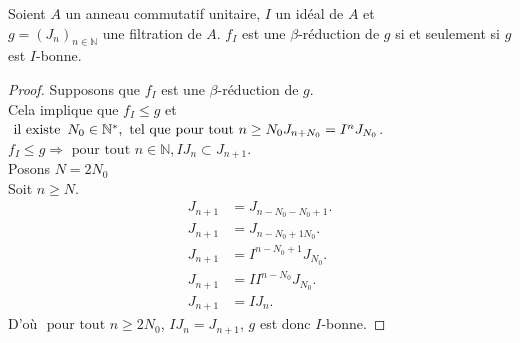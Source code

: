 \begin{maproposition}
	Soient $A$ un anneau commutatif unitaire, $I$ un idéal de $A$ et \\ $g = (J_n)_{n \in \mathbb{N}}$ une filtration de $A$. $f_I$ est une $\beta$-réduction de $g$ si et seulement si $g$ est $I$-bonne.
\end{maproposition}
\begin{proof}
	Supposons que $f_I$ est une $\beta$-réduction de $g$.\\
	Cela implique que $f_I \leq g$ et $\text{ il existe } \, N_0 \in \mathbb{N^*} , \text{ tel que pour tout } n \geq N_0 \\ J_{n+N_0} = I^n J_{N_0}$.\\
	$f_I \leq g \Rightarrow \text{ pour tout } n \in \mathbb{N} , IJ_n \subset J_{n+1}$.\\
	Posons $N = 2N_0$\\
	Soit $n \geq N$. 
	\begin{align*}
		J_{n+1} &= J_{n-N_0-N_0+1}.\\
		J_{n+1} &= J_{n-N_0+1N_0}.\\
		J_{n+1} &= I^{n-N_0+1} J_{N_0}.\\
		J_{n+1} &= II^{n-N_0} J_{N_0}.\\
		J_{n+1} &= IJ_n.
	\end{align*}
	D'où $\text{ pour tout } n \geq 2N_0$, $IJ_n = J_{n+1}$, $g$ est donc $I$-bonne. 
\end{proof}


